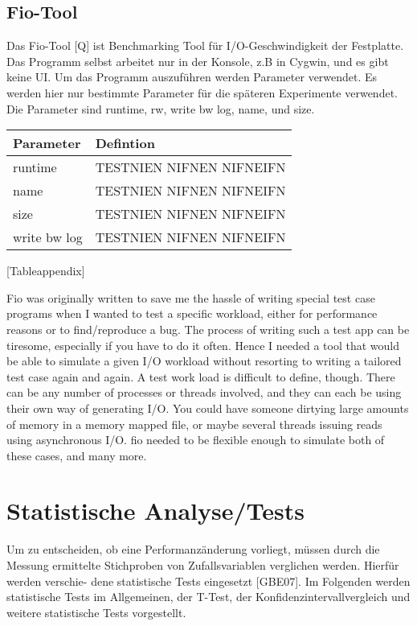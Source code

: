 \subsection{Fio-Tool}
Das Fio-Tool [Q] ist Benchmarking Tool für I/O-Geschwindigkeit der Festplatte.
Das Programm selbst arbeitet nur in der Konsole, z.B in Cygwin, und es gibt keine UI.
Um das Programm auszuführen werden Parameter verwendet. Es werden hier nur bestimmte Parameter 
für die späteren Experimente verwendet.
Die Parameter sind runtime, rw, write bw log, name, und size.


\begin{center}
\begin{tabularx}{\textwidth}{|X|X|}
  \hline
    Parameter& Defintion \\ 
  \hline
  runtime & TESTNIEN NIFNEN NIFNEIFN  \\ 
  \hline
  name &  TESTNIEN NIFNEN NIFNEIFN   \\ 
  \hline
  size &  TESTNIEN NIFNEN NIFNEIFN   \\ 
  \hline
  write bw log &  TESTNIEN NIFNEN NIFNEIFN   \\ 
  \hline
\end{tabularx}
\end{center}
[Tableappendix]

Fio was originally written to save me the hassle of writing special test case programs when I wanted to test a specific workload, 
either for performance reasons or to find/reproduce a bug. The process of writing such a test app can be tiresome, especially
 if you have to do it often. Hence I needed a tool that would be able to simulate a given 
I/O workload without resorting to writing a tailored test case again and again.
A test work load is difficult to define, though. There can be any number of processes or threads involved, 
and they can each be using their own way of generating I/O. You could have someone dirtying large amounts of memory in a memory mapped file,
 or maybe several threads issuing reads using asynchronous I/O. fio needed to be flexible enough to simulate both of these cases, and many more.

\section{Statistische Analyse/Tests}
Um zu entscheiden, ob eine Performanzänderung vorliegt, müssen durch die Messung
ermittelte Stichproben von Zufallsvariablen verglichen werden. Hierfür werden verschie-
dene statistische Tests eingesetzt [GBE07]. Im Folgenden werden statistische Tests im
Allgemeinen, der T-Test, der Konfidenzintervallvergleich und weitere statistische Tests
vorgestellt.

